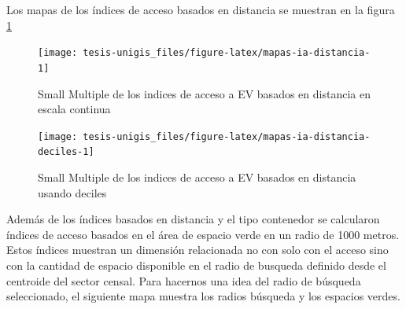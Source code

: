 \documentclass[12pt,]{book}
\begin{document}
Los mapas de los índices de acceso basados en distancia se muestran en
la figura \ref{fig:mapas-ia-distancia}

\begin{figure}
\texttt{[image: tesis-unigis\_files/figure-latex/mapas-ia-distancia-1]} \caption{Small Multiple de los indices de acceso a EV basados en distancia en escala continua}\label{fig:mapas-ia-distancia}
\end{figure}

\begin{figure}
\texttt{[image: tesis-unigis\_files/figure-latex/mapas-ia-distancia-deciles-1]} \caption{Small Multiple de los indices de acceso a EV basados en distancia usando deciles}\label{fig:mapas-ia-distancia-deciles}
\end{figure}

Además de los índices basados en distancia y el tipo contenedor se
calcularon índices de acceso basados en el área de espacio verde en un
radio de 1000 metros. Estos índices muestran un dimensión relacionada no
con solo con el acceso sino con la cantidad de espacio disponible en el
radio de busqueda definido desde el centroide del sector censal. Para
hacernos una idea del radio de búsqueda seleccionado, el siguiente mapa
muestra los radios búsqueda y los espacios verdes.
\end{document}
